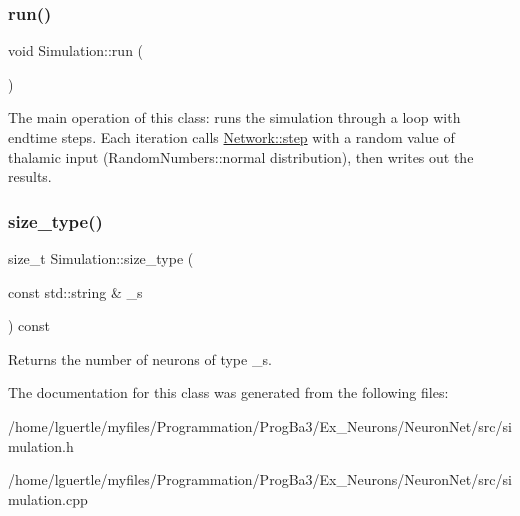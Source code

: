 \subsubsection{\texorpdfstring{run()}{run()}}
{\footnotesize\ttfamily void Simulation\+::run (\begin{DoxyParamCaption}{ }\end{DoxyParamCaption})}

The main operation of this class\+: runs the simulation through a loop with endtime steps. Each iteration calls \hyperlink{classNetwork_a53665a3a69e6ec894c313d0ce3fb7f34}{Network\+::step} with a random value of thalamic input (Random\+Numbers\+::normal distribution), then writes out the results. \mbox{\label{classSimulation_a7d0ca858dfec187001ecbab2081f9d04}} 
\subsubsection{\texorpdfstring{size\+\_\+type()}{size\_type()}}
{\footnotesize\ttfamily size\+\_\+t Simulation\+::size\+\_\+type (\begin{DoxyParamCaption}\item[{const std\+::string \&}]{\+\_\+s }\end{DoxyParamCaption}) const}

Returns the number of neurons of type \+\_\+s. 

The documentation for this class was generated from the following files\+:\begin{DoxyCompactItemize}
\item 
/home/lguertle/myfiles/\+Programmation/\+Prog\+Ba3/\+Ex\+\_\+\+Neurons/\+Neuron\+Net/src/simulation.\+h\item 
/home/lguertle/myfiles/\+Programmation/\+Prog\+Ba3/\+Ex\+\_\+\+Neurons/\+Neuron\+Net/src/simulation.\+cpp\end{DoxyCompactItemize}
